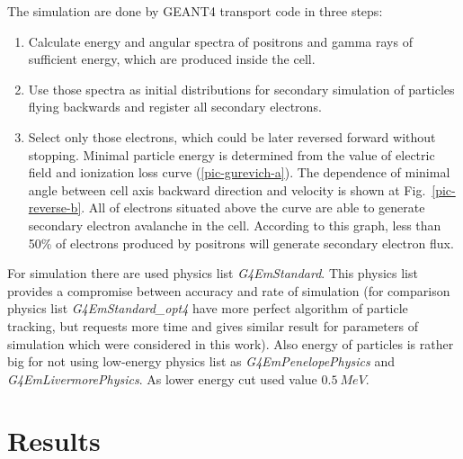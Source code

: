 \documentclass[utf8]{webofc}
\begin{document}
    The simulation are done by GEANT4 transport code \cite{ALLISON2016186} in three steps:
    
    \begin{enumerate}
        \item Calculate energy and angular spectra of positrons and gamma rays of sufficient energy, which are produced inside the cell.
        \item Use those spectra as initial distributions for secondary simulation of particles flying backwards and register all secondary electrons.
        \item Select only those electrons, which could be later reversed forward without stopping. Minimal particle energy is determined from the value of electric field and ionization loss curve (\ref{pic-gurevich-a}). The dependence of minimal angle between cell axis backward direction and velocity is shown at Fig.~\ref{pic-reverse-b}.  All of electrons situated above the curve are able to generate secondary electron avalanche in the cell. According to this graph, less than 50\% of electrons produced by positrons will generate secondary electron flux.
    \end{enumerate}
    For simulation there are used physics list \textit{G4EmStandard}. This physics list provides a compromise between accuracy and rate of simulation (for comparison physics list \textit{G4EmStandard\_opt4} have more perfect algorithm of particle tracking, but requests more time and gives similar result for parameters of simulation which were considered in this work). Also energy of particles is rather big for not using low-energy physics list as \textit{G4EmPenelopePhysics} and \textit{G4EmLivermorePhysics}. As lower energy cut used value $0.5~MeV$.
    
    
    
    \section{Results}
    
\end{document}

